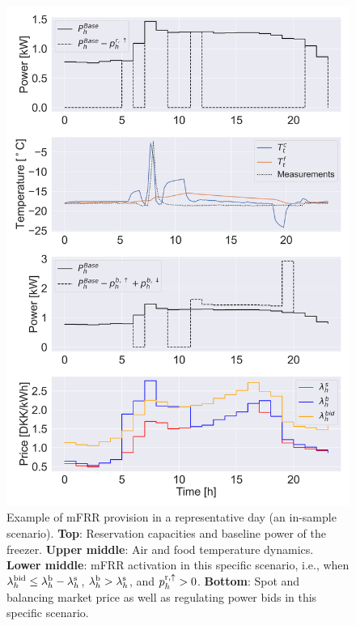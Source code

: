 \begin{figure}[t]
    \centering
    \includegraphics[width=\columnwidth]{../figures/mFRR_single_case.png}
    \caption{Example of mFRR  provision  in a representative day (an in-sample scenario). \textbf{Top}: Reservation capacities and baseline power of the freezer. \textbf{Upper middle}: Air and food temperature dynamics. \textbf{Lower middle}: mFRR activation in this specific scenario, i.e., when $\lambda_{h}^{\rm{bid}} \leq \lambda_{h}^{\rm{b}}-\lambda_{h}^{\rm{s}}$, $\lambda_{h}^{\rm{b}} > \lambda_{h}^{\rm{s}}$, and $p^{\rm{r},\uparrow}_{h} > 0$. \textbf{Bottom}: Spot and balancing market price as well as regulating power bids in this specific scenario.}
    \label{fig:fig_second_case}
        \vspace{-4mm}
\end{figure}


